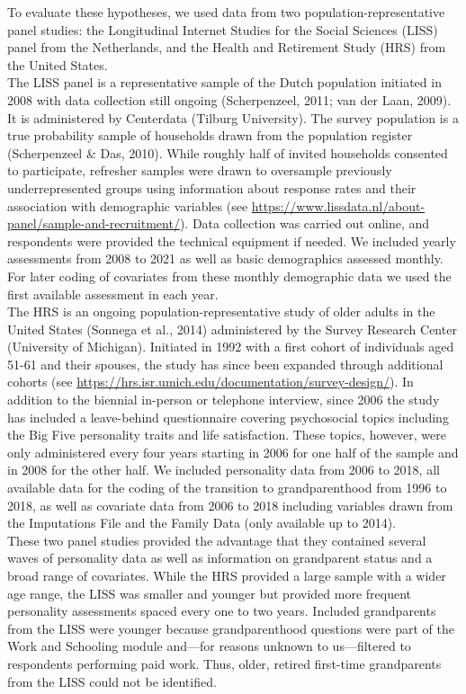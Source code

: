 \documentclass[
  english,
  man,floatsintext]{apa7}
\begin{document}
To evaluate these hypotheses, we used data from two population-representative panel studies: the Longitudinal Internet Studies for the Social Sciences (LISS) panel from the Netherlands, and the Health and Retirement Study (HRS) from the United States.\\
The LISS panel is a representative sample of the Dutch population initiated in 2008 with data collection still ongoing (Scherpenzeel, 2011; van der Laan, 2009). It is administered by Centerdata (Tilburg University). The survey population is a true probability sample of households drawn from the population register (Scherpenzeel \& Das, 2010). While roughly half of invited households consented to participate, refresher samples were drawn to oversample previously underrepresented groups using information about response rates and their association with demographic variables (see \url{https://www.lissdata.nl/about-panel/sample-and-recruitment/}). Data collection was carried out online, and respondents were provided the technical equipment if needed. We included yearly assessments from 2008 to 2021 as well as basic demographics assessed monthly. For later coding of covariates from these monthly demographic data we used the first available assessment in each year.\\
The HRS is an ongoing population-representative study of older adults in the United States (Sonnega et al., 2014) administered by the Survey Research Center (University of Michigan). Initiated in 1992 with a first cohort of individuals aged 51-61 and their spouses, the study has since been expanded through additional cohorts (see \url{https://hrs.isr.umich.edu/documentation/survey-design/}). In addition to the biennial in-person or telephone interview, since 2006 the study has included a leave-behind questionnaire covering psychosocial topics including the Big Five personality traits and life satisfaction. These topics, however, were only administered every four years starting in 2006 for one half of the sample and in 2008 for the other half. We included personality data from 2006 to 2018, all available data for the coding of the transition to grandparenthood from 1996 to 2018, as well as covariate data from 2006 to 2018 including variables drawn from the Imputations File and the Family Data (only available up to 2014).\\
These two panel studies provided the advantage that they contained several waves of personality data as well as information on grandparent status and a broad range of covariates. While the HRS provided a large sample with a wider age range, the LISS was smaller and younger but provided more frequent personality assessments spaced every one to two years. Included grandparents from the LISS were younger because grandparenthood questions were part of the Work and Schooling module and---for reasons unknown to us---filtered to respondents performing paid work. Thus, older, retired first-time grandparents from the LISS could not be identified.
\end{document}
